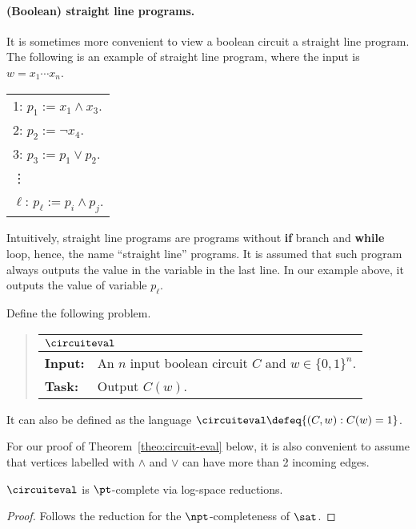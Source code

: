 \documentclass[11pt, a4paper]{article}
\begin{document}
\paragraph*{(Boolean) straight line programs.}
It is sometimes more convenient to view a boolean circuit a straight line program.
The following is an example of straight line program,
where the input is $w=x_1\cdots x_n$.
\begin{center}
\begin{tabular}{l}
{\footnotesize 1:}\; $p_1 := x_1 \wedge x_3$.
\\
{\footnotesize 2:}\; $p_2 := \neg x_4$.
\\
{\footnotesize 3:}\; $p_3 := p_1 \vee p_2$.
\\
\vdots
\\
{\footnotesize $\ell$:}\; $p_{\ell} := p_{i} \wedge p_{j}$.
\end{tabular}
\end{center}
Intuitively, straight line programs are programs without {\bf if} branch and {\bf while} loop,
hence, the name ``straight line'' programs.
It is assumed that such program always outputs the value in the variable in the last line.
In our example above, it outputs the value of variable $p_{\ell}$.


Define the following problem.
\begin{quote}
{\def\arraystretch{1.25}
\begin{tabular}{|ll|}
\hline
\multicolumn{2}{|l|}{$\circuiteval$}
\\
\hline
{\bf Input:}
&
An $n$ input boolean circuit $C$ and $w\in \{0,1\}^n$.
\\
{\bf Task:}
&
Output $C(w)$.
\\
\hline
\end{tabular}}
\end{quote}
It can also be defined as the language $\circuiteval \defeq \{ (C,w) : C(w) = 1\}$.



For our proof of Theorem~\ref{theo:circuit-eval} below, 
it is also convenient to assume that vertices labelled with $\wedge$ and $\vee$
can have more than 2 incoming edges.


\begin{theorem}
\label{theo:circuit-eval}
$\circuiteval$ is $\pt$-complete via log-space reductions.
\end{theorem}
\begin{proof}
Follows the reduction for the $\npt$-completeness of $\sat$.
\end{proof}
\end{document}
